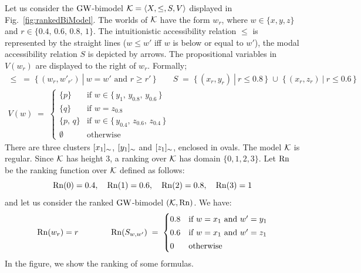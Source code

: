  \begin{example}\label{ex:rankedBiModel}
   Let us consider the   $\mbox{$\mathrm{GW}$}$-bimodel $\mathcal{K}=\langle X,\leq,S,V \rangle$
   displayed in Fig.~\ref{fig:rankedBiModel}.
The worlds of $\mathcal{K}$ have the form $w_r$, where $w\in\{x,y,z\}$ and  $r\in\{0.4,\,0.6,\,0.8,\,1\}$.
The intuitionistic accessibility relation $\leq$ is
  represented by the straight lines ($w\leq w'$ iff $w$ is below or
  equal to $w'$), the modal accessibility relation $S$ is depicted by  arrows.
 The   propositional variables in $V(w_r)$ are displayed to the right of
  $w_r$. 
Formally;
\[
   \begin{array}{l}
\leq\;=\;\{\,(w_r,w'_{r'})~|~\text{$w=w'$ and $r\geq r'$} \,\}
 \qquad %
     S\;=\;\{\, (x_r,y_r)~|~r\leq 0.8 \,\}\;\cup\; \{\, (x_r,z_r)~|~r\leq 0.6 \,\}
     \\[1ex]
     V(w)\;=\;
     \begin{cases}
\{p\}   & \text{if $w\in\{\,y_1,\,y_{0.8},\,y_{0.6} \,\}$}
\\[1ex]
\{q\}   & \text{if $w= z_{0.8}$}
\\[1ex]
 \{p,\,q\}   & \text{if $w\in\{\,y_{0.4},\,z_{0.6},\,z_{0.4} \,\}$}         
\\[1ex]
 \emptyset   & \text{otherwise}         
     \end{cases}
   \end{array}
\]
There are three clusters $[x_1]_\sim$, $[y_1]_\sim$ and
  $[z_1]_\sim$, enclosed in ovals. 
  The model $\mathcal{K}$ is regular. Since  $\mathcal{K}$  has height 3, a ranking over $\mathcal{K}$ has domain $\{0,1,2,3\}$.
  Let $\mathrm{Rn}$ be the ranking function over $\mathcal{K}$ defined as follows:
  \[
  \mathrm{Rn}(0) = 0.4, \quad  \mathrm{Rn}(1) = 0.6, \quad  \mathrm{Rn}(2) = 0.8, \quad   \mathrm{Rn}(3) = 1
\]
and let us consider the  ranked $\mbox{$\mathrm{GW}$}$-bimodel $(\mathcal{K},\mathrm{Rn})$.
We have:
\[
\mathrm{Rn}(w_r)=r
\hspace{4em}
  \mathrm{Rn}(S_{w,w'}) \;=\; 
  \begin{cases}
0.8 &\text{if $w=x_1$ and $w'=y_1$}
\\[0.5ex]
 0.6 &\text{if $w=x_1$ and $w'=z_1$}
\\[0.5ex]
0 & \text{otherwise}
  \end{cases}
\]  
In the figure, we show the
ranking of some formulas.
\EndEx
 \end{example}








